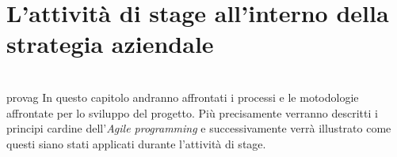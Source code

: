 
\chapter{L'attività di stage all'interno della strategia aziendale}
\label{cap:processi-metodologie}
\\
 \gls{provag} In questo capitolo andranno affrontati i processi e le motodologie affrontate per lo sviluppo del progetto. Più precisamente verranno descritti i principi cardine dell’\textit{Agile programming}
e successivamente verrà illustrato come questi siano stati applicati durante l'attività di stage.\\

